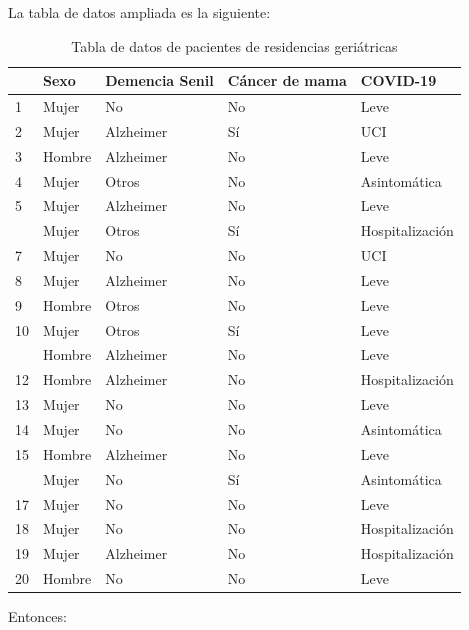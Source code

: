 \documentclass[
]{book}
\theoremstyle{definition}
\theoremstyle{definition}
\theoremstyle{definition}
\theoremstyle{definition}
\theoremstyle{remark}
\begin{document}
La tabla de datos ampliada es la siguiente:

\begin{table}

\caption{\label{tab:tablager3}Tabla de datos de pacientes de residencias geriátricas}
\centering
\begin{tabular}[t]{lllll}
\toprule
  & Sexo & Demencia Senil & Cáncer de mama & COVID-19\\
\midrule
1 & Mujer & No & No & Leve\\
2 & Mujer & Alzheimer & Sí & UCI\\
3 & Hombre & Alzheimer & No & Leve\\
4 & Mujer & Otros & No & Asintomática\\
5 & Mujer & Alzheimer & No & Leve\\
\addlinespace
6 & Mujer & Otros & Sí & Hospitalización\\
7 & Mujer & No & No & UCI\\
8 & Mujer & Alzheimer & No & Leve\\
9 & Hombre & Otros & No & Leve\\
10 & Mujer & Otros & Sí & Leve\\
\addlinespace
11 & Hombre & Alzheimer & No & Leve\\
12 & Hombre & Alzheimer & No & Hospitalización\\
13 & Mujer & No & No & Leve\\
14 & Mujer & No & No & Asintomática\\
15 & Hombre & Alzheimer & No & Leve\\
\addlinespace
16 & Mujer & No & Sí & Asintomática\\
17 & Mujer & No & No & Leve\\
18 & Mujer & No & No & Hospitalización\\
19 & Mujer & Alzheimer & No & Hospitalización\\
20 & Hombre & No & No & Leve\\
\bottomrule
\end{tabular}
\end{table}

Entonces:
\end{document}

